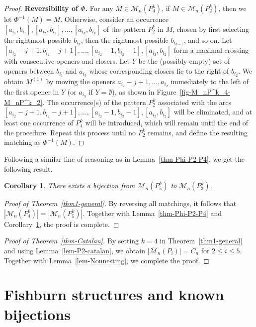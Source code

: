 \documentclass[11pt]{article}
\newtheorem{coro}[thm]{Corollary}
\newcommand{\M}{\mathcal{M}}
\begin{document}
\begin{proof}
		{\bf Reversibility of $\Phi$.} For any $M \in \mathcal{M}_n(P^k_4)$, if $M \in \mathcal{M}_n(P^k_2)$, then we let $\Phi^{-1}(M) = M$.  
		Otherwise, consider an occurrence $[a_{i_1}, b_{i_1}], [a_{i_2}, b_{i_2}], \ldots, [a_{i_k}, b_{i_k}]$ of the pattern $P^k_2$ in $M$, chosen by first selecting the rightmost possible $b_{i_k}$, then the rightmost possible $b_{i_{k-1}}$, and so on.  Let $[a_{i_2}-j+1, b_{i_2}-j+1], \ldots, [a_{i_2}-1, b_{i_2}-1], [a_{i_2}, b_{i_2}]$ form a maximal crossing with consecutive openers and closers.  
		Let $Y$ be the (possibly empty) set of openers between $b_{i_1}$ and $a_{i_3}$ whose corresponding closers lie to the right of $b_{i_2}$.  
		We obtain $M^{(1)}$ by moving the openers $a_{i_2}-j+1, \ldots, a_{i_2}$ immediately to the left of the first opener in $Y$ (or $a_{i_3}$ if $Y = \emptyset$), as shown in Figure~\ref{fig-M_nP^k_4-M_nP^k_2}.  The occurrence(s) of the pattern $P^k_2$ associated with the arcs $[a_{i_2}-j+1, b_{i_2}-j+1], \ldots, [a_{i_2}-1, b_{i_2}-1], [a_{i_2}, b_{i_2}]$ will be eliminated, and at least one occurrence of $P^k_4$ will be introduced, which will remain until the end of the procedure.  
		Repeat this process until no $P^k_2$ remains, and define the resulting matching as $\Phi^{-1}(M)$.
	\end{proof}
	
	Following a similar line of reasoning as in Lemma~\ref{thm-Phi-P2-P4}, we get the following result.
	\begin{coro}\label{coro-Phi-P5-P3}
		There exists a bijection from $\M_n(P^k_5)$ to $\M_n(P^k_3)$.
	\end{coro}
	
	\begin{proof}[Proof of Theorem~\ref{thm1-general}]
		By reversing all matchings, it follows that 
		\(|\mathcal{M}_n(P^k_4)| = |\mathcal{M}_n(P^k_5)|\).  Together with Lemma~\ref{thm-Phi-P2-P4} and Corollary~\ref{coro-Phi-P5-P3}, the proof is complete.
	\end{proof}
	
	\begin{proof}[Proof of Theorem~\ref{thm-Catalan}]
		By setting $k=4$ in Theorem~\ref{thm1-general} and using Lemma~\ref{lem-P2-catalan}, we  obtain 
		$|\M_n(P_i)|= C_n$ for $2\le i\le 5$.
		Together with Lemma~\ref{lem-Nonnesting}, we complete the proof.
	\end{proof}
	
	\section{Fishburn structures and known bijections}\label{sec-bijection}
	
\end{document}
